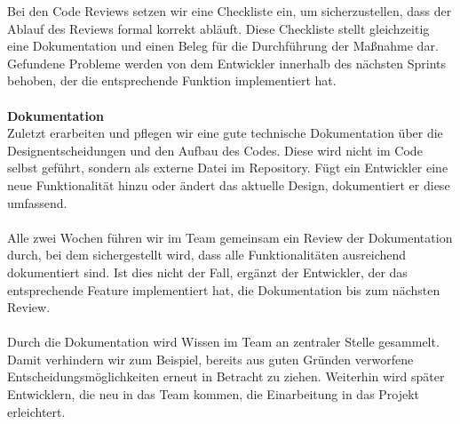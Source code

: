     Bei den Code Reviews setzen wir eine Checkliste ein, um sicherzustellen, dass der Ablauf des Reviews formal korrekt abläuft. Diese Checkliste stellt gleichzeitig eine Dokumentation und einen Beleg für die Durchführung der Maßnahme dar. Gefundene Probleme werden von dem Entwickler innerhalb des nächsten Sprints behoben, der die entsprechende Funktion implementiert hat.\\\\
    \textbf{Dokumentation}\\
    Zuletzt erarbeiten und pflegen wir eine gute technische Dokumentation über die Designentscheidungen und den Aufbau des Codes. Diese wird nicht im Code selbst geführt, sondern als externe Datei im Repository. Fügt ein Entwickler eine neue Funktionalität hinzu oder ändert das aktuelle Design, dokumentiert er diese umfassend.\\\\
    Alle zwei Wochen führen wir im Team gemeinsam ein Review der Dokumentation durch, bei dem sichergestellt wird, dass alle Funktionalitäten ausreichend dokumentiert sind. Ist dies nicht der Fall, ergänzt der Entwickler, der das entsprechende Feature implementiert hat, die Dokumentation bis zum nächsten Review.\\\\
    Durch die Dokumentation wird Wissen im Team an zentraler Stelle gesammelt. Damit verhindern wir zum Beispiel, bereits aus guten Gründen verworfene Entscheidungsmöglichkeiten erneut in Betracht zu ziehen. Weiterhin wird später Entwicklern, die neu in das Team kommen, die Einarbeitung in das Projekt erleichtert.

